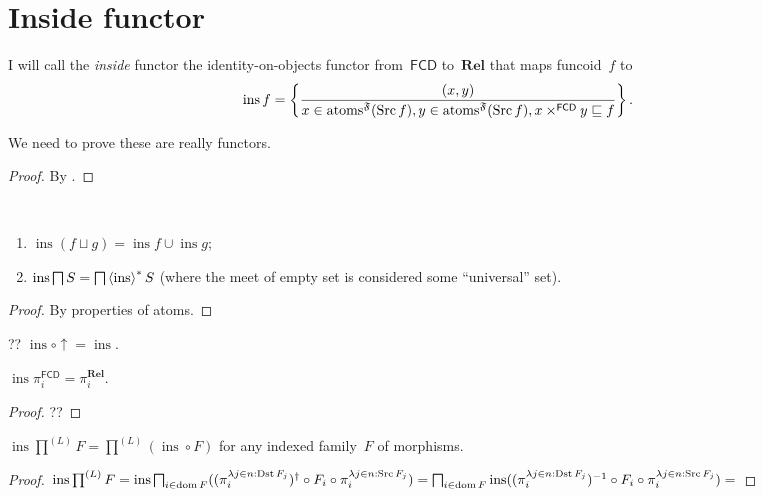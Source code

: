 \chapter{Inside functor}

\begin{defn}
I will call the \emph{inside} functor the identity-on-objects functor from~$\mathsf{FCD}$ to~$\mathbf{Rel}$ that maps
funcoid~$f$ to
\[
\operatorname{ins} f =
\left\{ \frac{(x,y)}{x\in\operatorname{atoms}^{\mathfrak{F}}(\operatorname{Src} f), y\in\operatorname{atoms}^{\mathfrak{F}}(\operatorname{Src} f), x\times^{\mathsf{FCD}}y\sqsubseteq f}\right\}. \]
\end{defn}

We need to prove these are really functors.

\begin{proof}
By \cite[proposition~]{volume-1}.
\end{proof}

\begin{prop}
~
\begin{enumerate}
\item $\operatorname{ins}(f\sqcup g)=\operatorname{ins}f\cup\operatorname{ins}g$;
\item $\operatorname{ins}\bigsqcap S=\bigsqcap\left\langle \operatorname{ins}\right\rangle ^{\ast}S$ (where the meet of empty set is considered some ``universal'' set).
\end{enumerate}
\end{prop}

\begin{proof}
By properties of atoms.
\end{proof}

\begin{prop}
?? $\operatorname{ins}\circ\uparrow = \operatorname{ins}$.
\end{prop}

\begin{prop}
$\operatorname{ins}\pi^{\mathsf{FCD}}_i=\pi^{\mathbf{Rel}}_i$.
\end{prop}

\begin{proof}
??
\end{proof}

\begin{prop}
$\operatorname{ins}\prod^{(L)}F =
\prod^{(L)}(\operatorname{ins}\circ F)$ for any indexed family~$F$ of morphisms.
\end{prop}

\begin{proof}
$\operatorname{ins}\prod^{(L)}F =
\operatorname{ins}\bigsqcap_{i \in \operatorname{dom} F} ((\pi^{\lambda j \in n :
\operatorname{Dst} F_j}_i)^{\dagger} \circ F_i \circ \pi^{\lambda j \in n :
\operatorname{Src} F_j}_i) =
\bigsqcap_{i \in \operatorname{dom} F}\operatorname{ins} ((\pi^{\lambda j \in n :
\operatorname{Dst} F_j}_i)^{-1} \circ F_i \circ \pi^{\lambda j \in n :
\operatorname{Src} F_j}_i) =
$
\end{proof}